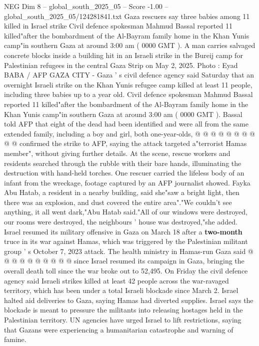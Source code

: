 \begin{textsample}{NEG Dim 8 – global\_south\_2025\_05 – Score -1.00 – global\_south\_2025\_05/124281841.txt}  \label{ex:f8_neg_015}
Gaza rescuers say three babies among 11 killed in Israel strike Civil defence spokesman Mahmud Bassal reported 11 killed"after the bombardment of the Al-Bayram family home in the Khan Yunis camp"in southern Gaza at around 3:00 am ( 0000 GMT ).
A man carries salvaged concrete blocks inside a building hit in an Israeli strike in the Bureij camp for Palestinian refugees in the central Gaza Strip on May 2, 2025.
Photo : Eyad BABA / AFP GAZA CITY - Gaza ' s civil defence agency said Saturday that an overnight Israeli strike on the Khan Yunis refugee camp killed at least 11 people, including three babies up to a year old.
Civil defence spokesman Mahmud Bassal reported 11 killed"after the bombardment of the Al-Bayram family home in the Khan Yunis camp"in southern Gaza at around 3:00 am ( 0000 GMT ).
Bassal told AFP that eight of the dead had been identified and were all from the same extended family, including a boy and girl, both one-year-olds, @ @ @ @ @ @ @ @ @ @ confirmed the strike to AFP, saying the attack targeted a"terrorist Hamas member", without giving further details.
At the scene, rescue workers and residents searched through the rubble with their bare hands, illuminating the destruction with hand-held torches.
One rescuer carried the lifeless body of an infant from the wreckage, footage captured by an AFP journalist showed.
Fayka Abu Hatab, a resident in a nearby building, said she"saw a bright light, then there was an explosion, and dust covered the entire area"."We couldn't see anything, it all went dark,"Abu Hatab said."All of our windows were destroyed, our rooms were destroyed, the neighbours ' house was destroyed,"she added.
Israel resumed its military offensive in Gaza on March 18 after a \textbf{two-month} truce in its war against Hamas, which was triggered by the Palestinian militant group ' s October 7, 2023 attack.
The health ministry in Hamas-run Gaza said @ @ @ @ @ @ @ @ @ @ since Israel resumed its campaign in Gaza, bringing the overall death toll since the war broke out to 52,495.
On Friday the civil defence agency said Israeli strikes killed at least 42 people across the war-ravaged territory, which has been under a total Israeli blockade since March 2.
Israel halted aid deliveries to Gaza, saying Hamas had diverted supplies.
Israel says the blockade is meant to pressure the militants into releasing hostages held in the Palestinian territory.
UN agencies have urged Israel to lift restrictions, saying that Gazans were experiencing a humanitarian catastrophe and warning of famine.

\end{textsample}
